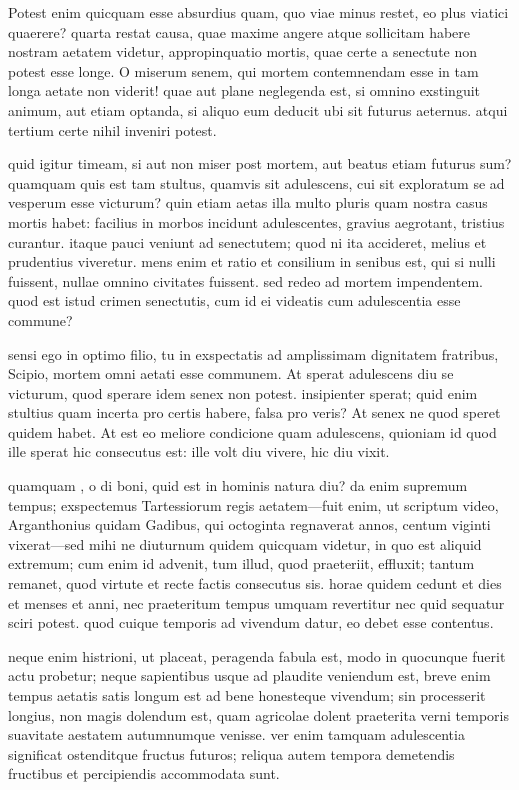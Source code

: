  Potest enim quicquam esse absurdius quam, quo viae minus restet, eo plus viatici quaerere? quarta restat causa, quae maxime angere atque sollicitam habere nostram aetatem videtur, appropinquatio mortis, quae certe a senectute non potest esse longe. O miserum senem, qui mortem contemnendam esse in tam longa aetate non viderit! quae aut plane neglegenda est, si omnino exstinguit animum, aut etiam optanda, si aliquo eum deducit ubi sit futurus aeternus. atqui tertium certe nihil inveniri potest.

 quid igitur timeam, si aut non miser post mortem, aut beatus etiam futurus sum? quamquam quis est tam stultus, quamvis sit adulescens, cui sit exploratum se ad vesperum esse victurum? quin etiam aetas illa multo pluris quam nostra casus mortis habet: facilius in morbos incidunt adulescentes, gravius aegrotant, tristius curantur. itaque pauci veniunt ad senectutem; quod ni ita accideret, melius et prudentius viveretur. mens enim et ratio et consilium in senibus est, qui si nulli fuissent, nullae omnino civitates fuissent. sed redeo ad mortem impendentem. quod est istud crimen senectutis, cum id ei videatis cum adulescentia esse commune?

 sensi ego in optimo filio, tu in exspectatis ad amplissimam dignitatem fratribus, Scipio, mortem omni aetati esse communem. At sperat adulescens diu se victurum, quod sperare idem senex non potest. insipienter sperat; quid enim stultius quam incerta pro certis habere, falsa pro veris? At senex ne quod speret quidem habet. At est eo meliore condicione quam adulescens, quioniam id quod ille sperat hic consecutus est: ille volt diu vivere, hic diu vixit.

 quamquam , o di boni, quid est in hominis natura diu? da enim supremum tempus; exspectemus Tartessiorum regis aetatem—fuit enim, ut scriptum video, Arganthonius quidam Gadibus, qui octoginta regnaverat annos, centum viginti vixerat—sed mihi ne diuturnum quidem quicquam videtur, in quo est aliquid extremum; cum enim id advenit, tum illud, quod praeteriit, effluxit; tantum remanet, quod virtute et recte factis consecutus sis. horae quidem cedunt et dies et menses et anni, nec praeteritum tempus umquam revertitur nec quid sequatur sciri potest. quod cuique temporis ad vivendum datur, eo debet esse contentus.

 neque enim histrioni, ut placeat, peragenda fabula est, modo in quocunque fuerit actu probetur; neque sapientibus usque ad plaudite veniendum est, breve enim tempus aetatis satis longum est ad bene honesteque vivendum; sin processerit longius, non magis dolendum est, quam agricolae dolent praeterita verni temporis suavitate aestatem autumnumque venisse. ver enim tamquam adulescentia significat ostenditque fructus futuros; reliqua autem tempora demetendis fructibus et percipiendis accommodata sunt.

